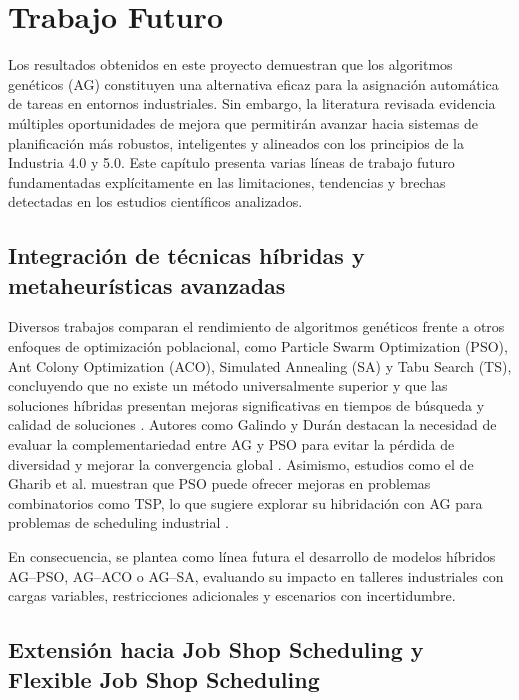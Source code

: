 \chapter{Trabajo Futuro}

Los resultados obtenidos en este proyecto demuestran que los algoritmos genéticos (AG) 
constituyen una alternativa eficaz para la asignación automática de tareas en entornos 
industriales. Sin embargo, la literatura revisada evidencia múltiples oportunidades de 
mejora que permitirán avanzar hacia sistemas de planificación más robustos, inteligentes 
y alineados con los principios de la Industria 4.0 y 5.0. Este capítulo presenta varias líneas 
de trabajo futuro fundamentadas explícitamente en las limitaciones, tendencias y brechas 
detectadas en los estudios científicos analizados.

\section{Integración de técnicas híbridas y metaheurísticas avanzadas}

Diversos trabajos comparan el rendimiento de algoritmos genéticos frente a otros enfoques 
de optimización poblacional, como Particle Swarm Optimization (PSO), Ant Colony Optimization (ACO), 
Simulated Annealing (SA) y Tabu Search (TS), concluyendo que no existe un método 
universalmente superior y que las soluciones híbridas presentan mejoras significativas en 
tiempos de búsqueda y calidad de soluciones \cite{file_galindo_enjambres, file_psovsga}. 
Autores como Galindo y Durán destacan la necesidad de evaluar la complementariedad entre 
AG y PSO para evitar la pérdida de diversidad y mejorar la convergencia global 
\cite{file_galindo_enjambres}. Asimismo, estudios como el de Gharib et al. muestran que PSO 
puede ofrecer mejoras en problemas combinatorios como TSP, lo que sugiere explorar su 
hibridación con AG para problemas de scheduling industrial \cite{file_psovsga}.

En consecuencia, se plantea como línea futura el desarrollo de modelos híbridos 
AG–PSO, AG–ACO o AG–SA, evaluando su impacto en talleres industriales con cargas variables, 
restricciones adicionales y escenarios con incertidumbre.

\section{Extensión hacia Job Shop Scheduling y Flexible Job Shop Scheduling}

